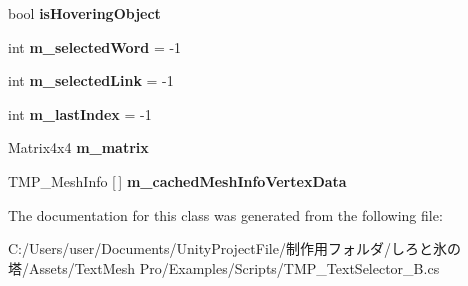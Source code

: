 \begin{DoxyCompactItemize}
\mbox{\label{class_t_m_pro_1_1_examples_1_1_t_m_p___text_selector___b_a47c822eef42b100d1dff8af755ff7701}} 
bool {\bfseries is\+Hovering\+Object}
\item 
\mbox{\label{class_t_m_pro_1_1_examples_1_1_t_m_p___text_selector___b_a9fbbcf01d8c6902632fddb7ab5c95e57}} 
int {\bfseries m\+\_\+selected\+Word} = -\/1
\item 
\mbox{\label{class_t_m_pro_1_1_examples_1_1_t_m_p___text_selector___b_a3838e328ea80d00173db573d04294c0f}} 
int {\bfseries m\+\_\+selected\+Link} = -\/1
\item 
\mbox{\label{class_t_m_pro_1_1_examples_1_1_t_m_p___text_selector___b_a0b18f4d696ce15dfcd4deb7aa38b4160}} 
int {\bfseries m\+\_\+last\+Index} = -\/1
\item 
\mbox{\label{class_t_m_pro_1_1_examples_1_1_t_m_p___text_selector___b_aaed1d8c14c79142ba5468b6157da8fbd}} 
Matrix4x4 {\bfseries m\+\_\+matrix}
\item 
\mbox{\label{class_t_m_pro_1_1_examples_1_1_t_m_p___text_selector___b_a24fc7c46e9057bbc8bb99b716a7b36b4}} 
T\+M\+P\+\_\+\+Mesh\+Info \mbox{[}$\,$\mbox{]} {\bfseries m\+\_\+cached\+Mesh\+Info\+Vertex\+Data}
\end{DoxyCompactItemize}


The documentation for this class was generated from the following file\+:\begin{DoxyCompactItemize}
\item 
C\+:/\+Users/user/\+Documents/\+Unity\+Project\+File/制作用フォルダ/しろと氷の塔/\+Assets/\+Text\+Mesh Pro/\+Examples/\+Scripts/T\+M\+P\+\_\+\+Text\+Selector\+\_\+\+B.\+cs\end{DoxyCompactItemize}
